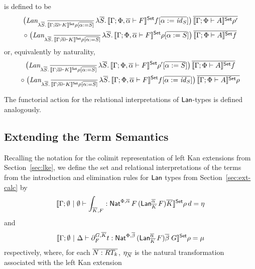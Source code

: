 \documentclass{lmcs}
\theoremstyle{plain}\newtheorem{satz}[thm]{Satz}
\renewcommand{\id}{\mathit{id}}
\begin{document}
\noindent
is defined to be 
\begin{multline*}
\big(\textit{Lan}_{\lambda \ol{S}.\,\ol{\setsem{\Gamma; \ol\alpha
      \vdash K}\rho[\ol{\alpha := S}]}}\,  
      \lambda \ol{S}.\,\setsem{\Gamma; \Phi, \ol\alpha \vdash
        F}f[\ol{\alpha := \id_S}]\big)\, 
    \ol{\setsem{\Gamma; \Phi \vdash A}\rho'} \\
\circ\;
  \big(\textit{Lan}_{\lambda \ol{S}.\,\ol{\setsem{\Gamma; \ol\alpha
        \vdash K}\rho[\ol{\alpha := S}]}}\,  
      \lambda \ol{S}.\,\setsem{\Gamma; \Phi, \ol\alpha \vdash
        F}\rho[\ol{\alpha := S}]\big)\, 
    \ol{\setsem{\Gamma; \Phi \vdash A}f}
\end{multline*}
or, equivalently by naturality,
\begin{multline*}
\big(\textit{Lan}_{\lambda \ol{S}.\,\ol{\setsem{\Gamma; \ol\alpha
      \vdash K}\rho[\ol{\alpha := S}]}}\, 
      \lambda \ol{S}.\,\setsem{\Gamma; \Phi, \ol\alpha \vdash
        F}\rho'[\ol{\alpha := S}]\big)\, 
    \ol{\setsem{\Gamma; \Phi \vdash A}f} \\
\circ\;
  \big(\textit{Lan}_{\lambda \ol{S}.\,\ol{\setsem{\Gamma; \ol\alpha
        \vdash K}\rho[\ol{\alpha := S}]}}\, 
     \lambda \ol{S}.\, \setsem{\Gamma; \Phi, \ol\alpha \vdash
       F}f[\ol{\alpha := \id_S}]\big)\, 
    \ol{\setsem{\Gamma; \Phi \vdash A}\rho}
\end{multline*}

\vspace*{0.05in}

\noindent
The functorial action for the relational interpretations of
$\mathsf{Lan}$-types is defined analogously.

\subsection{Extending the Term Semantics}\label{sec:term-sem}

Recalling the notation for the colimit representation of left Kan
extensions from Section~\ref{sec:lke}, we define the set and
relational interpretations of the terms from the introduction and
elimination rules for $\mathsf{Lan}$ types from Section~\ref{sec:ext-calc} by 
\[
\llbracket{\Gamma;\emptyset~|~\emptyset \vdash \int_{\overline{K},F}
: \mathsf{Nat}^{\Phi, \overline{\alpha}}\, F\, (\mathsf{Lan}^{\overline{\alpha}}_{\overline{K}}\,  F) \overline{K}}\rrbracket^{\mathsf{Set}}\rho\,d
= \eta
\]
and
\[
\llbracket{\Gamma;\emptyset~|~\Delta \vdash \partial^{G, \overline{K}}_F t 
: \mathsf{Nat}^{\Phi, \overline{\beta}}\, (\mathsf{Lan}^{\overline{\alpha}}_{\overline{K}}\,F) \overline{\beta}\; G}\rrbracket^{\mathsf{Set}}\rho
= \mu
\]
respectively, where, for each $\overline{N : RT_k}$, $\eta_{\overline{N}}$
is the natural transformation associated with the left Kan extension
\end{document}
